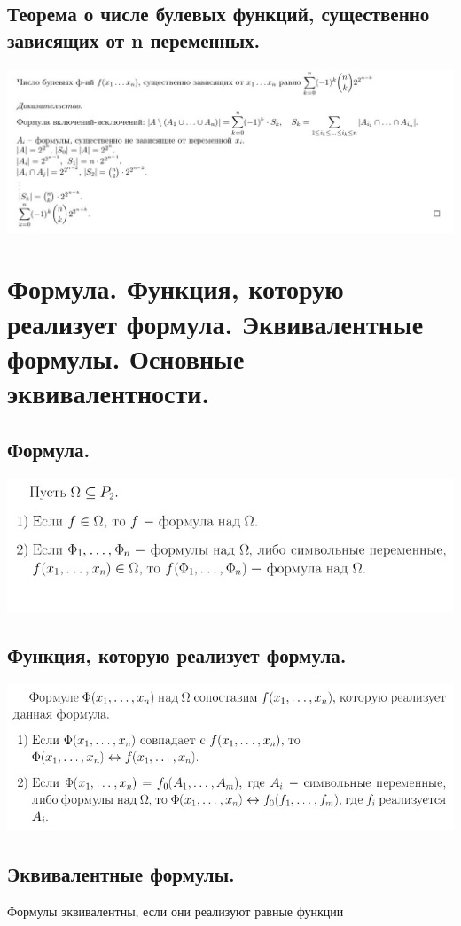 \documentclass[12pt]{article}
\begin{document}
\subsection{Теорема о числе булевых функций, существенно зависящих от n переменных.}
	\includegraphics[width=560pt]{15}

\section{Формула. Функция, которую реализует формула. Эквивалентные формулы. Основные эквивалентности.}
\subsection{Формула.}
	\includegraphics[width=500pt]{16}
\subsection{Функция, которую реализует формула.}
	\includegraphics[width=500pt]{17}
\subsection{Эквивалентные формулы.}
	Формулы эквивалентны, если они реализуют равные функции
\end{document}
